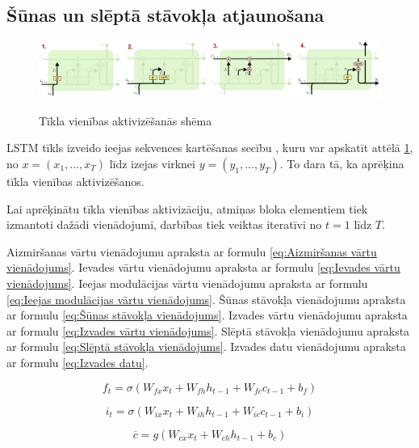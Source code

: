 \documentclass[12pt,paper=A4]{report}
\begin{document}
\subsection{Šūnas un slēptā stāvokļa atjaunošana}
 
\begin{figure}[H] \centering
\includegraphics[width=1.01\textwidth]{lstmSteps} 
\caption{Tīkla vienības aktivizēšanās shēma}
\cite{ANNTutorial}
  \label{lstmDeep} 
\end{figure}

LSTM tīkls izveido ieejas sekvences kartēšanas secību \cite{sak2014long}, kuru var apskatīt attēlā \ref{lstmDeep}, no $x = (x_1, ..., x_T)$ līdz izejas virknei $y = (y_1, ..., y_T)$. To dara tā, ka  aprēķina tīkla vienības aktivizēšanos.
  
 Lai aprēķinātu tīkla vienības aktivizāciju, atmiņas bloka elementiem tiek izmantoti dažādi vienādojumi, darbības tiek veiktas iteratīvi no $t = 1$ līdz $T$. 
 
Aizmiršanas vārtu vienādojumu apraksta ar formulu \ref{eq:Aizmiršanas vārtu vienādojums}.
Ievades vārtu vienādojumu apraksta ar formulu \ref{eq:Ievades vārtu vienādojums}.
Ieejas modulācijas vārtu vienādojumu apraksta ar formulu \ref{eq:Ieejas modulācijas vārtu vienādojums}.
Šūnas stāvokļa vienādojumu apraksta ar formulu \ref{eq:Šūnas stāvokļa vienādojums}.
Izvades vārtu vienādojumu apraksta ar formulu \ref{eq:Izvades vārtu vienādojums}.
Slēptā stāvokļa vienādojumu apraksta ar formulu \ref{eq:Slēptā stāvokļa vienādojums}.
Izvades datu vienādojumu apraksta ar formulu \ref{eq:Izvades datu}.

\begin{equation}
f_t = \sigma (W_{fx}x_t + W_{fh}h_{t-1} + W_{fc}c_{t-1} + b_f)\label{eq:Aizmiršanas vārtu vienādojums}
\end{equation}

\begin{equation}
i_t = \sigma (W_{ix}x_t + W_{ih}h_{t-1} + W_{ic}c_{t-1} + b_i)
\label{eq:Ievades vārtu vienādojums}
\end{equation}

\begin{equation}
\overline{c} = g (W_{cx}x_t + W_{ch}h_{t-1} + b_c) \label{eq:Ieejas modulācijas vārtu vienādojums}
\end{equation}
\end{document}
